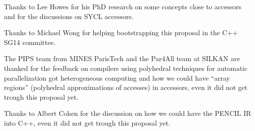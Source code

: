 \documentclass[a4paper]{article}
\begin{document}
Thanks to Lee Howes for his PhD \cite{PhD:Howes2010} research on some
concepts close to accessors and for the discussions on SYCL accessors.

Thanks to Michael Wong for helping bootstrapping this proposal in the
C++ SG14 committee.

The PIPS team from MINES ParisTech and the Par4All team at SILKAN are
thanked for the feedback on compilers using polyhedral techniques for
automatic parallelization got heterogeneous computing and how we could
have ``array regions'' (polyhedral approximations of accesses) in
accessors, even it did not get trough this proposal yet.

Thanks to Albert Cohen for the discussion on how we could have the
PENCIL IR \cite{PENCIL} into C++, even it did not get trough this
proposal yet.




\end{document}
